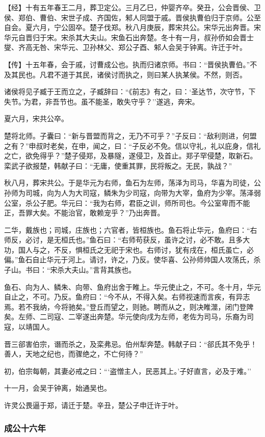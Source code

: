 \documentclass[]{article}
\begin{document}
【经】十有五年春王二月，葬卫定公。三月乙巳，仲婴齐卒。癸丑，公会晋侯、卫侯、郑伯、曹伯、宋世子成、齐国佐，邾人同盟于戚。晋侯执曹伯归于京师。公至自会。夏六月，宁公固卒。楚子伐郑。秋八月庚辰，葬宋共公。宋华元出奔晋。宋华元自晋归于宋。宋杀其大夫山。宋鱼石出奔楚。冬十有一月，叔孙侨如会晋士燮、齐高无咎、宋华元、卫孙林父、郑公子酉、邾人会吴于钟离。许迁于叶。

【传】十五年春，会于戚，讨曹成公也。执而归诸京师。书曰：``晋侯执曹伯。''不及其民也。凡君不道于其民，诸侯讨而执之，则曰某人执某侯。不然，则否。

诸侯将见子臧于王而立之，子臧辞曰：``《前志》有之，曰：`圣达节，次守节，下失节。'为君，非吾节也。虽不能圣，敢失守乎？''遂逃，奔宋。

夏六月，宋共公卒。

楚将北师。子囊曰：``新与晋盟而背之，无乃不可乎？''子反曰：``敌利则进，何盟之有？''申叔时老矣，在申，闻之，曰：``子反必不免。信以守礼，礼以庇身，信礼之亡，欲免得乎？''楚子侵郑，及暴隧，遂侵卫，及首止。郑子罕侵楚，取新石。栾武子欲报楚，韩献子曰：``无庸，使重其罪，民将叛之。无民，孰战？''

秋八月，葬宋共公。于是华元为右师，鱼石为左师，荡泽为司马，华喜为司徒，公孙师为司城，向为人为大司寇，鳞朱为少司寇，向带为大宰，鱼府为少宰。荡泽弱公室，杀公子肥。华元曰：``我为右师，君臣之训，师所司也。今公室卑而不能正，吾罪大矣。不能治官，敢赖宠乎？''乃出奔晋。

二华，戴族也；司城，庄族也；六官者，皆桓族也。鱼石将止华元，鱼府曰：``右师反，必讨，是无桓氏也。''鱼石曰：``右师苟获反，虽许之讨，必不敢。且多大功，国人与之，不反，惧桓氏之无祀于宋也。右师讨，犹有戌在，桓氏虽亡，必偏。''鱼石自止华元于河上。请讨，许之，乃反。使华喜、公孙师帅国人攻荡氏，杀子山。书曰：``宋杀大夫山。''言背其族也。

鱼石、向为人、鳞朱、向带、鱼府出舍于睢上。华元使止之，不可。冬十月，华元自止之，不可。乃反。鱼府曰：``今不从，不得入矣。右师视速而言疾，有异志焉。若不我纳，今将驰矣。''登丘而望之，则驰。聘而从之，则决睢澨，闭门登陴矣。左师、二司寇、二宰遂出奔楚。华元使向戌为左师，老佐为司马，乐裔为司寇，以靖国人。

晋三郤害伯宗，谮而杀之，及栾弗忌。伯州犁奔楚。韩献子曰：``郤氏其不免乎！善人，天地之纪也，而骤绝之，不亡何待？''

初，伯宗每朝，其妻必戒之曰：```盗憎主人，民恶其上。'子好直言，必及于难。''

十一月，会吴于钟离，始通吴也。

许灵公畏逼于郑，请迁于楚。辛丑，楚公子申迁许于叶。

\hypertarget{header-n1730}{%
\subsubsection{成公十六年}\label{header-n1730}}
\end{document}
